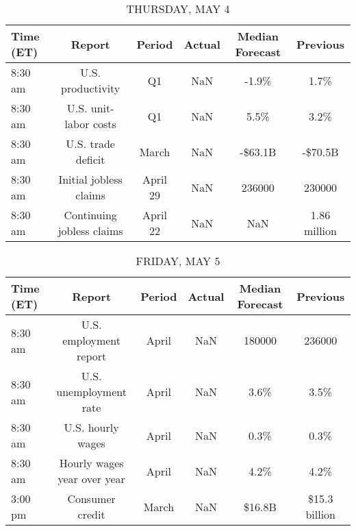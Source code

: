 \documentclass{article}%
\begin{document}
%


\begin{table}[htbp]%
\caption{THURSDAY, MAY 4}%
\centering%
\begin{adjustbox}{width=1\textwidth}%
\begin{tabular}{lccccc}
\toprule
Time (ET) &                    Report &   Period & Actual & Median Forecast &     Previous \\
\midrule
  8:30 am &         U.S. productivity &       Q1 &    NaN &           -1.9\% &         1.7\% \\
  8:30 am &     U.S. unit-labor costs &       Q1 &    NaN &            5.5\% &         3.2\% \\
  8:30 am &        U.S. trade deficit &    March &    NaN &         -\$63.1B &      -\$70.5B \\
  8:30 am &    Initial jobless claims & April 29 &    NaN &          236000 &       230000 \\
  8:30 am & Continuing jobless claims & April 22 &    NaN &             NaN & 1.86 million \\
\bottomrule
\end{tabular}
%
\end{adjustbox}%
\end{table}

%


\begin{table}[htbp]%
\caption{FRIDAY, MAY 5}%
\centering%
\begin{adjustbox}{width=1\textwidth}%
\begin{tabular}{lccccc}
\toprule
Time (ET) &                      Report & Period & Actual & Median Forecast &      Previous \\
\midrule
  8:30 am &      U.S. employment report &  April &    NaN &          180000 &        236000 \\
  8:30 am &      U.S. unemployment rate &  April &    NaN &            3.6\% &          3.5\% \\
  8:30 am &           U.S. hourly wages &  April &    NaN &            0.3\% &          0.3\% \\
  8:30 am & Hourly wages year over year &  April &    NaN &            4.2\% &          4.2\% \\
  3:00 pm &             Consumer credit &  March &    NaN &          \$16.8B & \$15.3 billion \\
\bottomrule
\end{tabular}
%
\end{adjustbox}%
\end{table}
\end{document}
